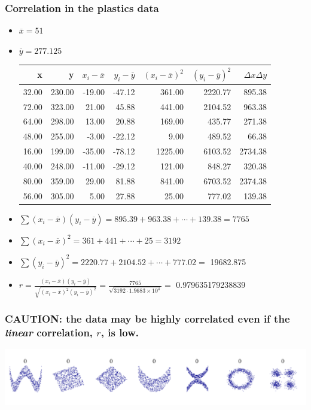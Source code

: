 \documentclass[handout]{beamer}
\providecommand{\ov}[1]{\overline{#1}}
\numberwithin{equation}{section}
\begin{document}
\begin{frame}
\frametitle{Correlation in the plastics data} \scriptsize
\begin{itemize}
\pause \item $\ov{x} = 51$
\pause \item $\ov{y} = 277.125$ \pause
\begin{table}[ht]
\centering
\begin{tabular}{rrrrrrr}
 x & y & $x_i - \ov{x}$ & $y_i - \ov{y}$ & $(x_i - \ov{x})^2$ & $(y_i - \ov{y})^2$ & $\Delta x \Delta y$ \\ 
  \hline
32.00 & 230.00 & -19.00 & -47.12 & 361.00 & 2220.77 & 895.38 \\ 
  72.00 & 323.00 & 21.00 & 45.88 & 441.00 & 2104.52 & 963.38 \\ 
  64.00 & 298.00 & 13.00 & 20.88 & 169.00 & 435.77 & 271.38 \\ 
  48.00 & 255.00 & -3.00 & -22.12 & 9.00 & 489.52 & 66.38 \\ 
  16.00 & 199.00 & -35.00 & -78.12 & 1225.00 & 6103.52 & 2734.38 \\ 
  40.00 & 248.00 & -11.00 & -29.12 & 121.00 & 848.27 & 320.38 \\ 
  80.00 & 359.00 & 29.00 & 81.88 & 841.00 & 6703.52 & 2374.38 \\ 
  56.00 & 305.00 & 5.00 & 27.88 & 25.00 & 777.02 & 139.38 \\ 
  \end{tabular}
\end{table}\pause \item $\sum (x_i - \ov{x})(y_i - \ov{y}) = 895.39 + 963.38 + \cdots + 139.38 = 7765$
\pause \item $\sum (x_i - \ov{x})^2 = 361 + 441 + \cdots + 25 = 3192$
\pause \item $\sum (y_i - \ov{y})^2 = 2220.77 + 2104.52 + \cdots + 777.02 = $ 19682.875
\pause \item $r = \frac{ (x_i - \ov{x})(y_i - \ov{y})  }{\sqrt{  (x_i - \ov{x})^2   (y_i - \ov{y})^2  }} = \frac{7765}{\sqrt{3192 \cdot 1.9683 \times 10^4}} = $ 0.979635179238839
\end{itemize}
\end{frame}

\begin{frame}
\frametitle{\small CAUTION: the data may be highly correlated even if the \emph{linear} correlation, $r$, is low.}
 \includegraphics{../../fig/corr0.png}
\end{frame}
\end{document}
